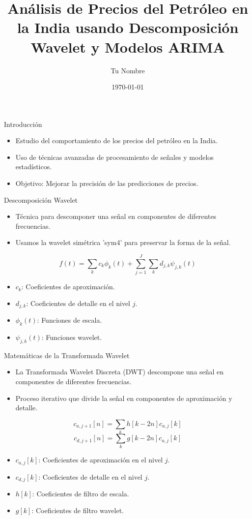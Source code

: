 \documentclass{beamer}
\title{Análisis de Precios del Petróleo en la India usando Descomposición Wavelet y Modelos ARIMA}
\author{Tu Nombre}
\date{\today}
\begin{document}
\frame{\titlepage}

\begin{frame}{Introducción}
\begin{itemize}
    \item Estudio del comportamiento de los precios del petróleo en la India.
    \item Uso de técnicas avanzadas de procesamiento de señales y modelos estadísticos.
    \item Objetivo: Mejorar la precisión de las predicciones de precios.
\end{itemize}
\end{frame}

\begin{frame}{Descomposición Wavelet}
\begin{itemize}
    \item Técnica para descomponer una señal en componentes de diferentes frecuencias.
    \item Usamos la wavelet simétrica 'sym4' para preservar la forma de la señal.
\end{itemize}
\begin{equation}
    f(t) = \sum_{k} c_{k} \phi_{k}(t) + \sum_{j=1}^{J} \sum_{k} d_{j,k} \psi_{j,k}(t)
\end{equation}
\begin{itemize}
    \item $c_k$: Coeficientes de aproximación.
    \item $d_{j,k}$: Coeficientes de detalle en el nivel \(j\).
    \item $\phi_{k}(t)$: Funciones de escala.
    \item $\psi_{j,k}(t)$: Funciones wavelet.
\end{itemize}
\end{frame}

\begin{frame}{Matemáticas de la Transformada Wavelet}
\begin{itemize}
    \item La Transformada Wavelet Discreta (DWT) descompone una señal en componentes de diferentes frecuencias.
    \item Proceso iterativo que divide la señal en componentes de aproximación y detalle.
\end{itemize}
\begin{equation}
    c_{a,j+1}[n] = \sum_k h[k-2n] c_{a,j}[k]
\end{equation}
\begin{equation}
    c_{d,j+1}[n] = \sum_k g[k-2n] c_{a,j}[k]
\end{equation}
\begin{itemize}
    \item $c_{a,j}[k]$: Coeficientes de aproximación en el nivel \(j\).
    \item $c_{d,j}[k]$: Coeficientes de detalle en el nivel \(j\).
    \item $h[k]$: Coeficientes de filtro de escala.
    \item $g[k]$: Coeficientes de filtro wavelet.
\end{itemize}
\end{frame}
\end{document}
